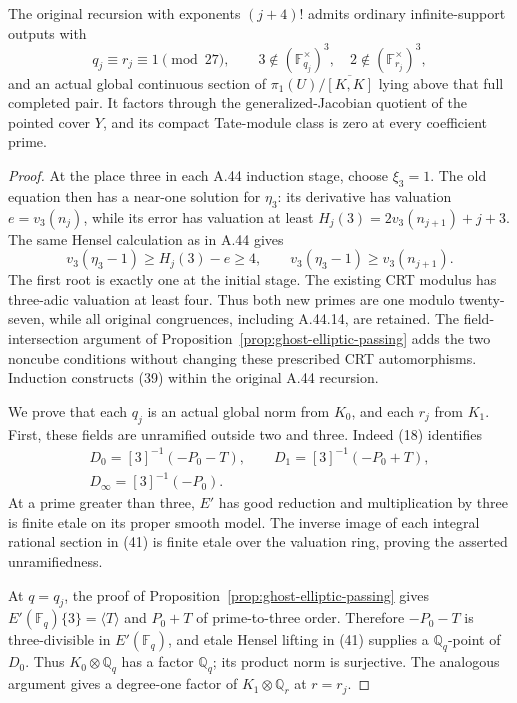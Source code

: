 \begin{proposition}
\label{prop:ghost-original-genjac-survival}
The original recursion with exponents \((j+4)!\)
admits ordinary infinite-support outputs with
\[
 q_j\equiv r_j\equiv1\pmod {27},\qquad
 3\notin(\mathbb F_{q_j}^\times)^3,
       \quad2\notin(\mathbb F_{r_j}^\times)^3,        \tag{39}
\]
and an actual global continuous section of
\(\pi_1(U)/\overline{[K,K]}\) lying above that
full completed pair. It factors through the
generalized-Jacobian quotient of the pointed
cover \(Y\), and its compact Tate-module class
is zero at every coefficient prime.
\end{proposition}
\begin{proof}
At the place three in each A.44 induction stage,
choose \(\xi_3=1\). The old equation then has
a near-one solution for \(\eta_3\): its derivative
has valuation \(e=v_3(n_j)\), while its error has
valuation at least
\(H_j(3)=2v_3(n_{j+1})+j+3\).
The same Hensel calculation as in A.44 gives
\[
 v_3(\eta_3-1)\ge H_j(3)-e\ge4,
       \qquad v_3(\eta_3-1)\ge v_3(n_{j+1}).         \tag{40}
\]
The first root is exactly one at the initial
stage. The existing CRT modulus has three-adic
valuation at least four. Thus both new primes
are one modulo twenty-seven, while all original
congruences, including A.44.14, are retained.
The field-intersection argument of
Proposition~\ref{prop:ghost-elliptic-passing}
adds the two noncube conditions without changing
these prescribed CRT automorphisms. Induction
constructs (39) within the original A.44 recursion.

We prove that each \(q_j\) is an actual global
norm from \(K_0\), and each \(r_j\) from \(K_1\).
First, these fields are unramified outside two
and three. Indeed (18) identifies
\[
 \begin{gathered}
 D_0=[3]^{-1}(-P_0-T),\qquad
 D_1=[3]^{-1}(-P_0+T),\\
 D_\infty=[3]^{-1}(-P_0).
 \end{gathered}                                      \tag{41}
\]
At a prime greater than three, \(E'\) has good
reduction and multiplication by three is finite
etale on its proper smooth model. The inverse
image of each integral rational section in (41)
is finite etale over the valuation ring, proving
the asserted unramifiedness.

At \(q=q_j\), the proof of
Proposition~\ref{prop:ghost-elliptic-passing} gives
\(E'(\mathbb F_q)\{3\}=\langle T\rangle\) and
\(P_0+T\) of prime-to-three order. Therefore
\(-P_0-T\) is three-divisible in
\(E'(\mathbb F_q)\), and etale Hensel lifting in
(41) supplies a \(\mathbb Q_q\)-point of \(D_0\).
Thus \(K_0\otimes\mathbb Q_q\) has a factor
\(\mathbb Q_q\); its product norm is surjective.
The analogous argument gives a degree-one factor
of \(K_1\otimes\mathbb Q_r\) at \(r=r_j\).


\end{proof}
